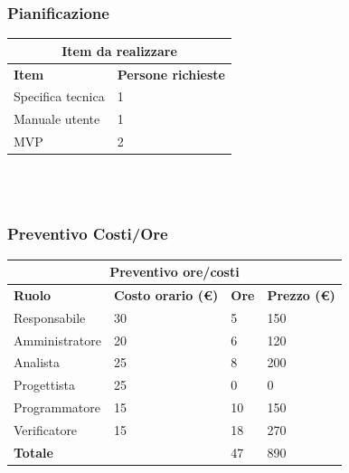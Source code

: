 \documentclass[9pt]{article}
\begin{document}
\subsubsection{Pianificazione}
\begin{center}
	\begin{tabularx}{\textwidth}{|X|X|}
		\hline
		\multicolumn{2}{|c|}{\textbf{Item da realizzare}}     \\
		\hline
		\hline
		\textbf{Item}            & \textbf{Persone richieste} \\
		\hline
		Specifica tecnica        	& 1                          \\
		\hline
		Manuale utente        	& 1                          \\
		\hline
		MVP        					& 2           \\
		\hline
	\end{tabularx}\\[8pt]
	\mbox{}\\
\end{center}
\subsubsection{Preventivo Costi/Ore}
\begin{center}
	\begin{tabularx}{\textwidth}{|X|X|X|X|}
		\hline
		\multicolumn{4}{|c|}{\textbf{Preventivo ore/costi}}                                      \\
		\hline
		\hline
		\textbf{Ruolo}  & \textbf{Costo orario (\euro)} & \textbf{Ore} & \textbf{Prezzo (\euro)} \\
		\hline									
		Responsabile    &	30		&	5		&	150		\\
		\hline									
		Amministratore  &	20		&	6		&	120		\\
		\hline									
		Analista        &	25		&	8		&	200		\\
		\hline									
		Progettista     &	25		&	0		&	0		\\
		\hline									
		Programmatore   &	15		&	10		&	150		\\
		\hline									
		Verificatore    &	15		&	18		&	270		\\
		\hline									
		\textbf{Totale} &			&	47		&	890		\\
		\hline																														
	\end{tabularx}\\[8pt]
	\mbox{}\\
\end{center}
\end{document}
